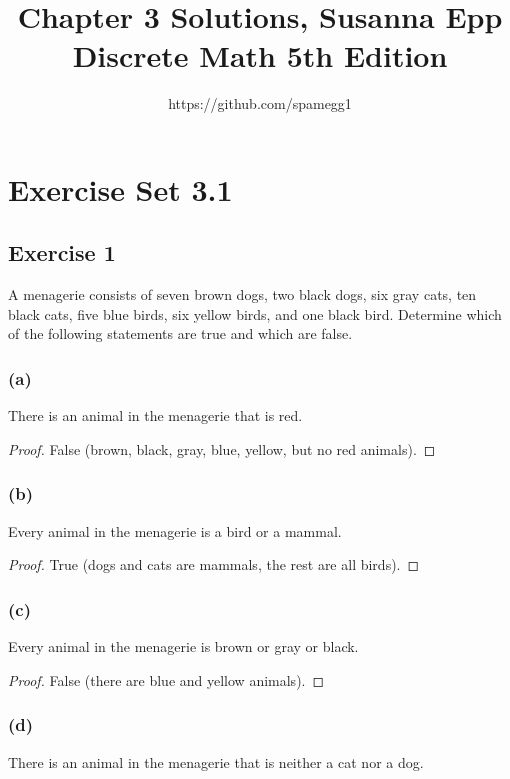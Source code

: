 \documentclass[14pt]{extarticle}
\title{Chapter 3 Solutions, Susanna Epp Discrete Math 5th Edition}
\author{https://github.com/spamegg1}
\begin{document}
\maketitle
\tableofcontents

\section{Exercise Set 3.1}

\subsection{Exercise 1}
A menagerie consists of seven brown dogs, two black dogs, six gray cats, ten black cats, five blue birds, six yellow birds, and one black bird. Determine which of the following statements are true and which are false.

\subsubsection{(a)}
There is an animal in the menagerie that is red.

\begin{proof}
    False (brown, black, gray, blue, yellow, but no red animals).
\end{proof}

\subsubsection{(b)}
Every animal in the menagerie is a bird or a mammal.

\begin{proof}
    True (dogs and cats are mammals, the rest are all birds).
\end{proof}

\subsubsection{(c)}
Every animal in the menagerie is brown or gray or black.

\begin{proof}
    False (there are blue and yellow animals).
\end{proof}

\subsubsection{(d)}
There is an animal in the menagerie that is neither a cat nor a dog.
\end{document}
